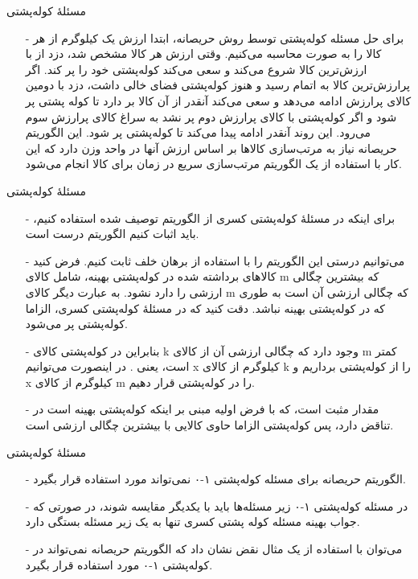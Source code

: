 \begin{frame}{مسئلهٔ کوله‌پشتی}
\begin{itemize}\itemr
\item[-]
برای حل مسئله کوله‌پشتی توسط روش حریصانه، ابتدا ارزش یک کیلوگرم از هر کالا را به صورت
محاسبه می‌کنیم. وقتی ارزش هر کالا مشخص شد، دزد از با ارزش‌ترین کالا شروع می‌کند و سعی می‌کند کوله‌پشتی خود را پر کند. اگر پرارزش‌ترین کالا به اتمام رسید و هنوز کوله‌پشتی فضای خالی داشت، دزد با دومین کالای پرارزش ادامه می‌دهد و سعی می‌کند آنقدر از آن کالا بر دارد تا کوله پشتی پر شود و اگر کوله‌پشتی با کالای پرارزش دوم پر نشد به سراغ کالای پرارزش سوم می‌رود. این روند آنقدر ادامه پیدا می‌کند تا کوله‌پشتی پر شود. این الگوریتم حریصانه نیاز به مرتب‌سازی کالاها بر اساس ارزش آنها در واحد وزن دارد که این کار با استفاده از یک الگوریتم مرتب‌سازی سریع در زمان
برای 
کالا انجام می‌شود.
\end{itemize}
\end{frame}

\begin{frame}{مسئلهٔ کوله‌پشتی}
\begin{itemize}\itemr
\item[-]
برای اینکه در مسئلهٔ کوله‌پشتی کسری از الگوریتم توصیف شده استفاده کنیم، باید اثبات کنیم الگوریتم درست است.
\item[-]
می‌توانیم درستی این الگوریتم را با استفاده از برهان خلف ثابت کنیم.
فرض کنید کالاهای برداشته شده در کوله‌پشتی بهینه، شامل کالای m که بیشترین چگالی ارزشی
 را دارد نشود. به عبارت دیگر کالای m که چگالی ارزشی آن
است به طوری که
در کوله‌پشتی بهینه نباشد.
دقت کنید که در مسئلهٔ کوله‌پشتی کسری، الزاما کوله‌پشتی پر می‌شود.
\item[-]
بنابراین در کوله‌پشتی کالای k وجود دارد که چگالی ارزشی آن از کالای m کمتر است، یعنی
 .
در اینصورت می‌توانیم x کیلوگرم از کالای k را از کوله‌پشتی برداریم و x کیلوگرم از کالای m را در کوله‌پشتی قرار دهیم.
\item[-]
مقدار
مثبت است، که با فرض اولیه مبنی بر اینکه کوله‌پشتی بهینه است در تناقض دارد، پس کوله‌پشتی الزاما حاوی کالایی با بیشترین چگالی ارزشی است.
\end{itemize}
\end{frame}


\begin{frame}{مسئلهٔ کوله‌پشتی}
\begin{itemize}\itemr
\item[-]
 الگوریتم حریصانه برای مسئله کوله‌پشتی ۱-۰ نمی‌تواند مورد استفاده قرار بگیرد.
\item[-]
در مسئله کوله‌پشتی ۱-۰ زیر مسئله‌ها باید با یکدیگر مقایسه شوند، در صورتی که جواب بهینه مسئله کوله پشتی کسری تنها به یک زیر مسئله بستگی دارد.
\item[-]
می‌توان با استفاده از یک مثال نقض نشان داد که الگوریتم حریصانه نمی‌تواند در کوله‌پشتی ۱-۰ مورد استفاده قرار بگیرد.
\end{itemize}
\end{frame}


